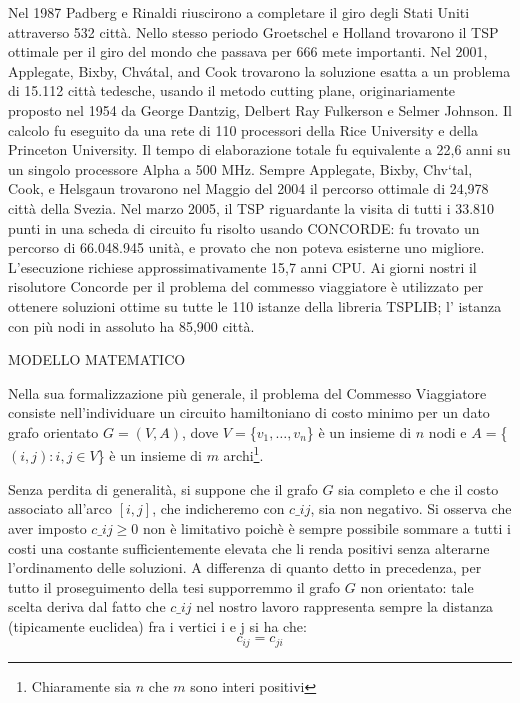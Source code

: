 \documentclass[11pt]{article}
\begin{document}
Nel 1987  Padberg e Rinaldi riuscirono a completare il giro degli Stati Uniti attraverso 532 città. Nello stesso periodo Groetschel e Holland trovarono il TSP ottimale per il giro del mondo che passava per 666 mete importanti. 
Nel 2001, Applegate, Bixby, Chvátal, and Cook trovarono la soluzione esatta a un problema di 15.112 città tedesche, usando il metodo cutting plane, originariamente proposto nel 1954 da George Dantzig, Delbert Ray Fulkerson e Selmer Johnson. Il calcolo fu eseguito da una rete di 110 processori della Rice University e della Princeton University. Il tempo di elaborazione totale fu equivalente a 22,6 anni su un singolo processore Alpha a 500 MHz.
Sempre Applegate, Bixby, Chv\a`tal, Cook, e Helsgaun trovarono nel Maggio del 2004 il percorso ottimale di 24,978 città della Svezia. 
Nel marzo 2005, il TSP riguardante la visita di tutti i 33.810 punti in una scheda di circuito fu risolto usando CONCORDE: fu trovato un percorso di 66.048.945 unità, e provato che non poteva esisterne uno migliore. L'esecuzione richiese approssimativamente 15,7 anni CPU. 
Ai giorni nostri il risolutore Concorde per il problema del commesso viaggiatore è utilizzato per ottenere soluzioni ottime su tutte le 110 istanze della libreria TSPLIB; l' istanza con più nodi in assoluto ha 85,900 città. 

\vspace{2\baselineskip}

MODELLO MATEMATICO
\vspace{2\baselineskip}

Nella sua formalizzazione più generale, il problema del Commesso Viaggiatore consiste nell'individuare un circuito hamiltoniano di costo minimo per un dato grafo orientato $G=(V,A)$, dove $V = $\{$ {v_1,\dots,v_n} $\}$ $ è un insieme di $n$ nodi e $A = $\{$ {(i,j): i, j \in V} $\}$ $ è un insieme di $m$ archi\footnote{Chiaramente sia $n$ che $m$ sono interi positivi}. 

Senza perdita di generalità, si suppone che il grafo $G$ sia completo e che il costo associato all'arco $[i,j]$, che indicheremo con $c\_{ij}$, sia non negativo. Si osserva che aver imposto $c\_{ij} \ge 0$ non è limitativo poichè è sempre possibile sommare a tutti i costi una costante sufficientemente elevata che li renda positivi senza alterarne l'ordinamento delle soluzioni. 
A differenza di quanto detto in precedenza, per tutto il proseguimento della tesi supporremmo il grafo $G$ non orientato: tale scelta deriva dal fatto che $c\_{ij}$ nel nostro lavoro rappresenta sempre la distanza (tipicamente euclidea) fra i vertici i e j si ha che:
$$c_{ij} = c_{ji}$$
\end{document}

